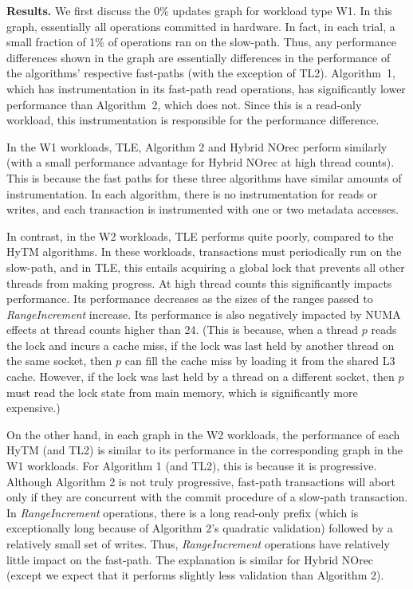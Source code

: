 \vspace{1mm}\noindent\textbf{Results.}
We first discuss the 0\% updates graph for workload type W1.
In this graph, essentially all operations committed in hardware.
In fact, in each trial, a small fraction of 1\% of operations ran on the slow-path.
Thus, any performance differences shown in the graph are essentially differences in the performance of the algorithms' respective fast-paths (with the exception of TL2).
Algorithm~1, which has instrumentation in its fast-path read operations, has significantly lower performance than Algorithm~2, which does not.
Since this is a read-only workload, this instrumentation is responsible for the performance difference.

In the W1 workloads, TLE, Algorithm 2 and Hybrid NOrec perform similarly (with a small performance advantage for Hybrid NOrec at high thread counts).
This is because the fast paths for these three algorithms have similar amounts of instrumentation.
In each algorithm, there is no instrumentation for reads or writes, and each transaction is instrumented with one or two metadata accesses.

In contrast, in the W2 workloads, TLE performs quite poorly, compared to the HyTM algorithms.
In these workloads, transactions must periodically run on the slow-path, and in TLE, this entails acquiring a global lock that prevents all other threads from making progress.
At high thread counts this significantly impacts performance.
Its performance decreases as the sizes of the ranges passed to \textit{RangeIncrement} increase.
Its performance is also negatively impacted by NUMA effects at thread counts higher than 24.
(This is because, when a thread $p$ reads the lock and incurs a cache miss, if the lock was last held by another thread on the same socket, then $p$ can fill the cache miss by loading it from the shared L3 cache.
However, if the lock was last held by a thread on a different socket, then $p$ must read the lock state from main memory, which is significantly more expensive.)

On the other hand, in each graph in the W2 workloads, the performance of each HyTM (and TL2) is similar to its performance in the corresponding graph in the W1 workloads.
For Algorithm 1 (and TL2), this is because it is progressive.
Although Algorithm 2 is not truly progressive, fast-path transactions will abort only if they are concurrent with the commit procedure of a slow-path transaction.
In \textit{RangeIncrement} operations, there is a long read-only prefix (which is exceptionally long because of Algorithm 2's quadratic validation) followed by a relatively small set of writes.
Thus, \textit{RangeIncrement} operations have relatively little impact on the fast-path.
The explanation is similar for Hybrid NOrec (except we expect that it performs slightly less validation than Algorithm 2).

